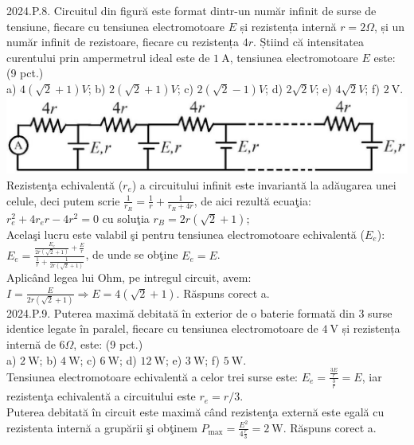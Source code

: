 2024.P.8. Circuitul din figură este format dintr-un număr infinit de surse de tensiune, fiecare cu tensiunea electromotoare $E$ și rezistența internă $r=2 \Omega$, și un număr infinit de rezistoare, fiecare cu rezistența $4 r$. Știind că intensitatea curentului prin ampermetrul ideal este de $1 \mathrm{~A}$, tensiunea electromotoare $E$ este: (9 pct.)\\ a) $4(\sqrt{2}+1) V$; b) $2(\sqrt{2}+1) V$; c) $2(\sqrt{2}-1) V$; d) $2 \sqrt{2} V$; e) $4 \sqrt{2} V$; f) $2 \mathrm{~V}$.\\ \includegraphics[width=0.4\linewidth]{images/2025_08_27_d74d983b3f0f59c27780g-3}\\ Rezistenţa echivalentă ($r_{e}$) a circuitului infinit este invariantă la adăugarea unei celule, deci putem scrie $\frac{1}{r_{R}}=\frac{1}{r}+\frac{1}{r_{R}+4 r}$, de aici rezultă ecuaţia:\\ $r_{e}^{2}+4 r_{e} r-4 r^{2}=0$ cu soluţia $r_{B}=2 r(\sqrt{2}+1)$;\\ Acelaşi lucru este valabil şi pentru tensiunea electromotoare echivalentă ($E_{e}$):\\ $E_{e}=\frac{\frac{E_{e}}{2 r(\sqrt{2}+1)}+\frac{E}{r}}{\frac{1}{r}+\frac{1}{2 r(\sqrt{2}+1)}}$, de unde se obţine $E_{e}=E$.\\ Aplicând legea lui Ohm, pe intregul circuit, avem:\\ $I=\frac{E}{2 r(\sqrt{2}+1)} \Rightarrow E=4(\sqrt{2}+1)$. Răspuns corect a.\\

2024.P.9. Puterea maximă debitată în exterior de o baterie formată din 3 surse identice legate în paralel, fiecare cu tensiunea electromotoare de $4 \mathrm{~V}$ și rezistența internă de $6 \Omega$, este: (9 pct.)\\ a) $2 \mathrm{~W}$; b) $4 \mathrm{~W}$; c) $6 \mathrm{~W}$; d) $12 \mathrm{~W}$; e) $3 \mathrm{~W}$; f) $5 \mathrm{~W}$.\\ Tensiunea electromotoare echivalentă a celor trei surse este: $E_{e}=\frac{\frac{3 E}{r}}{\frac{3}{r}}=E$, iar rezistenţa echivalentă a circuitului este $r_{e}=r / 3$.\\ Puterea debitată în circuit este maximă când rezistenţa externă este egală cu rezistenta internă a grupării şi obţinem $P_{\max}=\frac{E^{2}}{4 \frac{r}{3}}=2 \mathrm{~W}$. Răspuns corect a.\\


